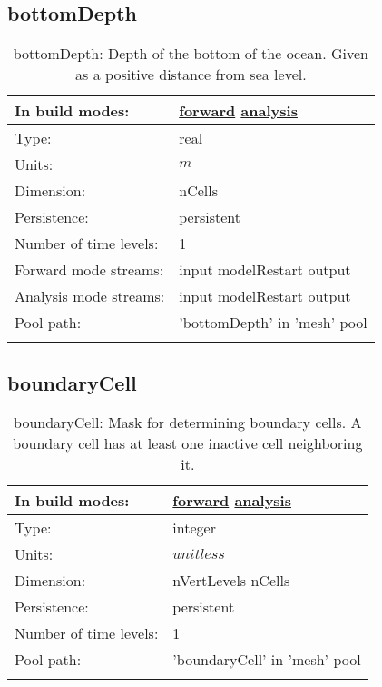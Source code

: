 \subsection[bottomDepth]{bottomDepth}
\label{subsec:var_sec_mesh_bottomDepth}
\begin{center}
\begin{longtable}{| p{2.0in} | p{4.0in} |}
        \hline 
        In build modes: & \hyperref[subsec:forward_var_tab_mesh]{forward} \hyperref[subsec:analysis_var_tab_mesh]{analysis} \\
        \hline 
        Type: & real \\
        \hline 
        Units: & $m$ \\
        \hline 
        Dimension: & nCells \\
        \hline 
        Persistence: & persistent \\
        \hline 
        Number of time levels: & 1 \\
        \hline 
		 Forward mode streams: &  input modelRestart output \\
        \hline 
		 Analysis mode streams: &  input modelRestart output \\
        \hline 
            Pool path: & 'bottomDepth' in 'mesh' pool
 \\
		 \hline 
    \caption{bottomDepth: Depth of the bottom of the ocean. Given as a positive distance from sea level.}
\end{longtable}
\end{center}
\subsection[boundaryCell]{boundaryCell}
\label{subsec:var_sec_mesh_boundaryCell}
\begin{center}
\begin{longtable}{| p{2.0in} | p{4.0in} |}
        \hline 
        In build modes: & \hyperref[subsec:forward_var_tab_mesh]{forward} \hyperref[subsec:analysis_var_tab_mesh]{analysis} \\
        \hline 
        Type: & integer \\
        \hline 
        Units: & $unitless$ \\
        \hline 
        Dimension: & nVertLevels nCells \\
        \hline 
        Persistence: & persistent \\
        \hline 
        Number of time levels: & 1 \\
        \hline 
            Pool path: & 'boundaryCell' in 'mesh' pool
 \\
		 \hline 
    \caption{boundaryCell: Mask for determining boundary cells. A boundary cell has at least one inactive cell neighboring it.}
\end{longtable}
\end{center}
